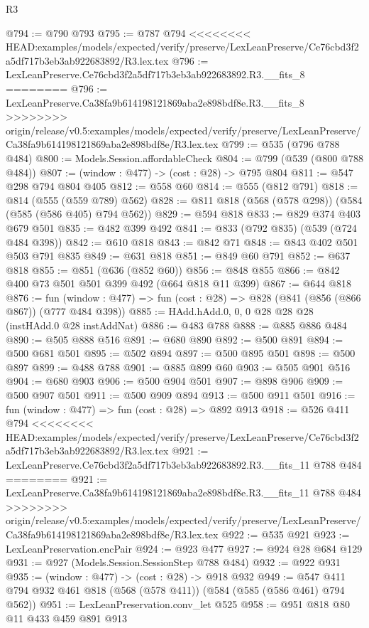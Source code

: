 \begin{lexlean}{R3}
\begin{coremodule}
{{{{{{{{{{{{{{{{{{{{{{{{{{@794 := @790 @793
@795 := @787 @794
<<<<<<<< HEAD:examples/models/expected/verify/preserve/LexLeanPreserve/Ce76cbd3f2a5df717b3eb3ab922683892/R3.lex.tex
@796 := LexLeanPreserve.Ce76cbd3f2a5df717b3eb3ab922683892.R3.__fits_8
========
@796 := LexLeanPreserve.Ca38fa9b614198121869aba2e898bdf8e.R3.__fits_8
>>>>>>>> origin/release/v0.5:examples/models/expected/verify/preserve/LexLeanPreserve/Ca38fa9b614198121869aba2e898bdf8e/R3.lex.tex
@799 := @535 (@796 @788 @484)
@800 := Models.Session.affordableCheck
@804 := @799 (@539 (@800 @788 @484))
@807 := (window : @477) -> (cost : @28) -> @795 @804
@811 := @547 @298 @794 @804 @405
@812 := @558 @60
@814 := @555 (@812 @791)
@818 := @814 (@555 (@559 @789) @562)
@828 := @811 @818 (@568 (@578 @298)) (@584 (@585 (@586 @405) @794 @562))
@829 := @594 @818
@833 := @829 @374 @403 @679 @501
@835 := @482 @399 @492
@841 := @833 (@792 @835) (@539 (@724 @484 @398))
@842 := @610 @818
@843 := @842 @71
@848 := @843 @402 @501 @503 @791 @835
@849 := @631 @818
@851 := @849 @60 @791
@852 := @637 @818
@855 := @851 (@636 (@852 @60))
@856 := @848 @855
@866 := @842 @400 @73 @501 @501 @399 @492 (@664 @818 @11 @399)
@867 := @644 @818
@876 := fun (window : @477) => fun (cost : @28) => @828 (@841 (@856 (@866 @867)) (@777 @484 @398))
@885 := HAdd.hAdd.{0, 0, 0} @28 @28 @28 (instHAdd.{0} @28 instAddNat)
@886 := @483 @788
@888 := @885 @886 @484
@890 := @505 @888 @516
@891 := @680 @890
@892 := @500 @891
@894 := @500 @681 @501
@895 := @502 @894
@897 := @500 @895 @501
@898 := @500 @897
@899 := @488 @788
@901 := @885 @899 @60
@903 := @505 @901 @516
@904 := @680 @903
@906 := @500 @904 @501
@907 := @898 @906
@909 := @500 @907 @501
@911 := @500 @909 @894
@913 := @500 @911 @501
@916 := fun (window : @477) => fun (cost : @28) => @892 @913
@918 := @526 @411 @794
<<<<<<<< HEAD:examples/models/expected/verify/preserve/LexLeanPreserve/Ce76cbd3f2a5df717b3eb3ab922683892/R3.lex.tex
@921 := LexLeanPreserve.Ce76cbd3f2a5df717b3eb3ab922683892.R3.__fits_11 @788 @484
========
@921 := LexLeanPreserve.Ca38fa9b614198121869aba2e898bdf8e.R3.__fits_11 @788 @484
>>>>>>>> origin/release/v0.5:examples/models/expected/verify/preserve/LexLeanPreserve/Ca38fa9b614198121869aba2e898bdf8e/R3.lex.tex
@922 := @535 @921
@923 := LexLeanPreservation.encPair
@924 := @923 @477
@927 := @924 @28 @684 @129
@931 := @927 (Models.Session.SessionStep @788 @484)
@932 := @922 @931
@935 := (window : @477) -> (cost : @28) -> @918 @932
@949 := @547 @411 @794 @932 @461 @818 (@568 (@578 @411)) (@584 (@585 (@586 @461) @794 @562))
@951 := LexLeanPreservation.conv_let @525
@958 := @951 @818 @80 @11 @433 @459 @891 @913
}}}}}}}}}}}}}}}}}}}}}}}}}}
\end{coremodule}
\end{lexlean}
